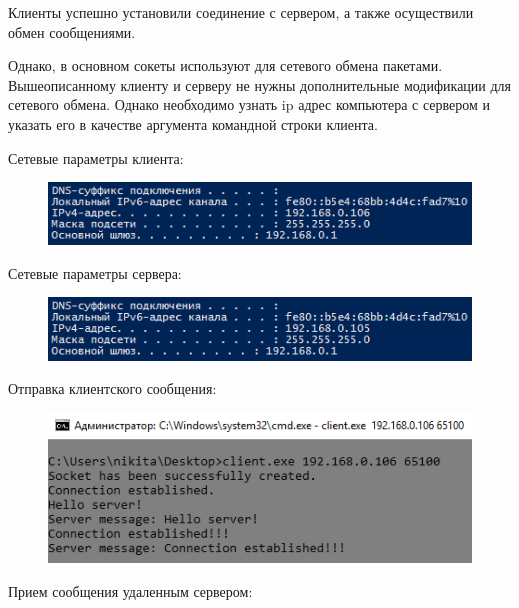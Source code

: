 \documentclass[14pt,a4paper,report]{report}
\begin{document}
Клиенты успешно установили соединение с сервером, а также осуществили обмен сообщениями.

Однако, в основном сокеты используют для сетевого обмена пакетами. Вышеописанному клиенту и серверу не нужны дополнительные модификации для сетевого обмена. Однако необходимо узнать ip адрес компьютера с сервером и указать его в качестве аргумента командной строки клиента.

Сетевые параметры клиента:

\begin{figure}[h!]
	\centering
	\includegraphics[scale = 0.90]{images/p3_3_client_config.png}
	
	\caption{}
	\label{image:11}
\end{figure}

Сетевые параметры сервера:

\begin{figure}[h!]
	\centering
	\includegraphics[scale = 0.90]{images/p3_3_server_config.png}
	
	\caption{}
	\label{image:12}
\end{figure}

\clearpage

Отправка клиентского сообщения:

\begin{figure}[h!]
	\centering
	\includegraphics[scale = 0.80]{images/p3_3_client_result.png}
	
	\caption{}
	\label{image:13}
\end{figure}

Прием сообщения удаленным сервером:
\end{document}
